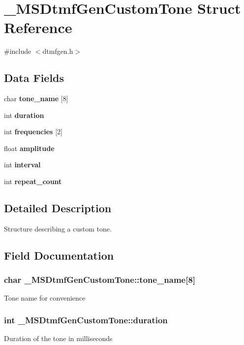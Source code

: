 \section{\_\-MSDtmfGenCustomTone Struct Reference}
\label{struct__MSDtmfGenCustomTone}


{\ttfamily \#include $<$dtmfgen.h$>$}\subsection*{Data Fields}
\begin{DoxyCompactItemize}
\item 
char {\bf tone\_\-name} [8]
\item 
int {\bf duration}
\item 
int {\bf frequencies} [2]
\item 
float {\bf amplitude}
\item 
int {\bf interval}
\item 
int {\bf repeat\_\-count}
\end{DoxyCompactItemize}


\subsection{Detailed Description}
Structure describing a custom tone. 

\subsection{Field Documentation}
\subsubsection[{tone\_\-name}]{\setlength{\rightskip}{0pt plus 5cm}char {\bf \_\-MSDtmfGenCustomTone::tone\_\-name}[8]}\label{struct__MSDtmfGenCustomTone_a5e609c3c1053e64fa7675bfc85abdb9d}
Tone name for convenience 
\subsubsection[{duration}]{\setlength{\rightskip}{0pt plus 5cm}int {\bf \_\-MSDtmfGenCustomTone::duration}}\label{struct__MSDtmfGenCustomTone_a78f4cd97c40ab6d3255d3103852b44b1}
Duration of the tone in milliseconds 
